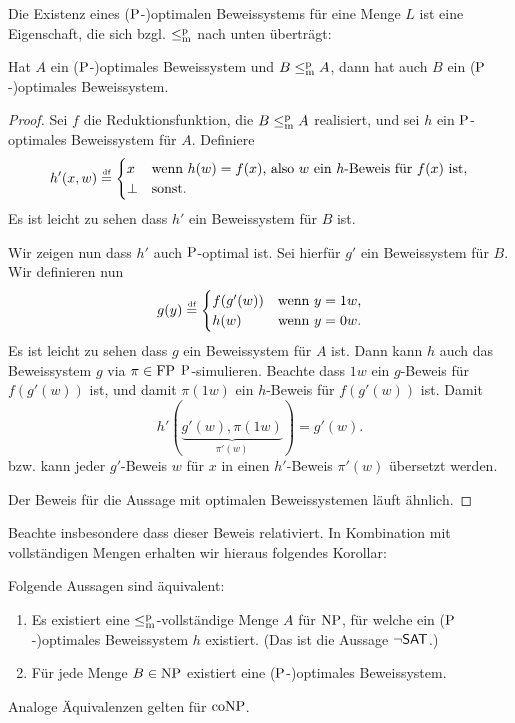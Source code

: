 Die Existenz eines ($\P$-)optimalen Beweissystems für eine Menge $L$ ist eine Eigenschaft, die sich bzgl. $\leqmp$ nach unten überträgt:
\begin{lemma}\label{lemma:optimal-downward}
    Hat $A$ ein ($\P$-)optimales Beweissystem und $B\leqmp A$, dann hat auch $B$ ein ($\P$-)optimales Beweissystem.
\end{lemma}
\begin{proof}
    \strut{} Sei $f$ die Reduktionsfunktion, die $B\leqmp A$ realisiert, und 
    sei $h$ ein $\P$-optimales Beweissystem für $A$. Definiere
    \[ h'(x,w) \defeq \begin{cases} x & \text{wenn $h(w)=f(x)$, also $w$ ein $h$-Beweis für $f(x)$ ist},\\ \bot & \text{sonst.} \end{cases} \]
    Es ist leicht zu sehen dass $h'$ ein Beweissystem für $B$ ist.

    Wir zeigen nun dass $h'$ auch $\P$-optimal ist. Sei hierfür $g'$ ein Beweissystem für $B$. Wir definieren nun
    \[ g(y) \defeq \begin{cases} f(g'(w)) & \text{wenn $y=1w$,}\\ h(w) & \text{wenn $y=0w$.} \end{cases}\]
    Es ist leicht zu sehen dass $g$ ein Beweissystem für $A$ ist. Dann kann $h$ auch das Beweissystem $g$ via $\pi\in\FP$ $\P$-simulieren.
    Beachte dass $1w$ ein $g$-Beweis für $f(g'(w))$ ist, und damit $\pi(1w)$ ein $h$-Beweis für $f(g'(w))$ ist.
    Damit
    \[ h'(\underbrace{g'(w), \pi(1w)}_{\pi'(w)}) = g'(w). \]
    bzw. kann jeder $g'$-Beweis $w$ für $x$ in einen $h'$-Beweis $\pi'(w)$ übersetzt werden.

    Der Beweis für die Aussage mit optimalen Beweissystemen läuft ähnlich.
\end{proof}
Beachte insbesondere dass dieser Beweis relativiert.
In Kombination mit vollständigen Mengen erhalten wir hieraus folgendes Korollar:
\begin{corollary}\label{cor:con-characterization}
    Folgende Aussagen sind äquivalent:
    \begin{enumerate}
        \item Es existiert eine $\leqmp$-vollständige Menge $A$ für $\NP$, für welche ein ($\P$-)optimales Beweissystem $h$ existiert. (Das ist die Aussage $\neg\hSAT$.)
        \item Für jede Menge $B\in\NP$ existiert eine ($\P$-)optimales Beweissystem.
    \end{enumerate}
    Analoge Äquivalenzen gelten für $\coNP$.
\end{corollary}
